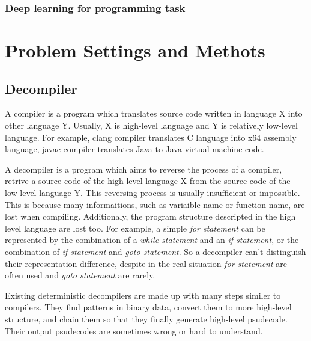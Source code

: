 \documentclass[senior,final,11pt]{iscs-thesis}
\begin{document}
\subsection{Deep learning for programming task}


\chapter{Problem Settings and Methots}

\section{Decompiler}


A compiler is a program which translates source code written in language X into other language Y. 
Usually, X is high-level language and Y is relatively low-level language. 
For example, clang compiler translates C language into x64 assembly language, javac compiler translates Java to Java virtual machine code.

A decompiler is a program which aims to reverse the process of a compiler, retrive a source code of the high-level language X from the source code of the low-level language Y. 
This reversing process is usually insufficient or impossible.
This is because many informaitions, such as variaible name or function name, are lost when compiling.
Additionaly, the program structure descripted in the high level language are lost too. 
For example, a simple {\sl for statement} can be represented by the combination of a {\sl while statement} and an {\sl if statement}, or the combination of {\sl if statement} and {\sl goto statement}. 
So a decompiler can't distinguish their representation difference, despite in the real situation {\sl for statement} are often used and {\sl goto statement} are rarely. 

Existing deterministic decompilers are made up with many steps similer to compilers. 
They find patterns in binary data, convert them to more high-level structure, and chain them so that they finally generate high-level psudecode.
Their output psudecodes are sometimes wrong or hard to understand.

\end{document}
